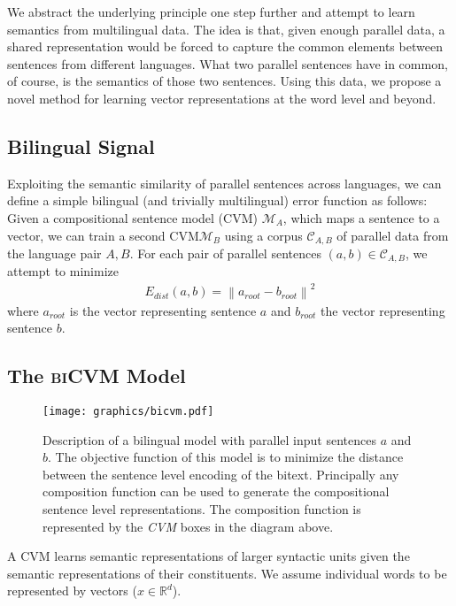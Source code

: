 \documentclass{article} \pdfoutput=1
\newcommand{\biCVM}{\textsc{biCVM}\xspace}
\newcommand{\CVM}{\textsc{CVM}\xspace}
\begin{document}
We abstract the underlying principle one step further and attempt to learn semantics from multilingual data.
The idea is that, given enough parallel data, a shared representation would be forced to capture the common elements between sentences from different languages.
What two parallel sentences have in common, of course, is the semantics of those two sentences.
Using this data, we propose a novel method for learning vector representations at the word level and beyond.

\subsection{Bilingual Signal}

Exploiting the semantic similarity of parallel sentences across languages, we
can define a simple bilingual (and trivially multilingual) error function as
follows: Given a compositional sentence model (\CVM) $\mathcal{M}_A$, which maps
a sentence to a vector, we can train a second \CVM $\mathcal{M}_B$ using a
corpus $\mathcal{C}_{A,B}$ of parallel data from the language pair $A,B$.  For
each pair of parallel sentences $(a,b) \in \mathcal{C}_{A,B}$, we attempt to
minimize
\begin{align}
E_{dist}(a,b) = \left\| a_{root} - b_{root} \right\|^2\label{eqn:bi-error}
\end{align}
where $a_{root}$ is the vector representing sentence $a$ and $b_{root}$ the vector representing sentence $b$.

\subsection{The \biCVM Model}

\begin{figure}[t]
\begin{center}
\texttt{[image: graphics/bicvm.pdf]}
\caption{Description of a bilingual model with parallel input sentences $a$ and $b$. The objective function of this model is to minimize the distance between the sentence level encoding of the bitext. Principally any composition function can be used to generate the compositional sentence level representations. The composition function is represented by the \textit{CVM} boxes in the diagram above.
}\label{fig:bilingual}
\end{center}
\end{figure}

A \CVM learns semantic representations of larger syntactic units given the semantic representations of their constituents.
We assume individual words to be represented by vectors ($x\in\mathbb{R}^d$).
\end{document}
